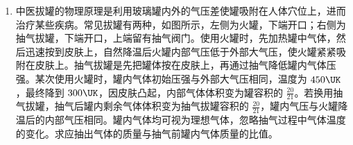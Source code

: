 \documentclass[\gkver]{gaokaozhenti}
\begin{document}
\begin{enumerate}
{

②由 $U-I$ 图像知，干电池的电动势为 $E=1.55\UV$，电压表示数为 0 时，电路中的电流为 $0.6\UA$，由闭合电路欧姆定律得 $r+R=\frac{E}{I}=\frac{1.55\UV}{0.6\UA}\approx2.58\UO$，电源内阻小于 $1\UO$，故所选的定值电阻为 $R_{1}$。

③实物图连接如图所示。

}

\item
中医拔罐的物理原理是利用玻璃罐内外的气压差使罐吸附在人体穴位上，进而治疗某些疾病。常见拔罐有两种，如图所示，左侧为火罐，下端开口；右侧为抽气拔罐，下端开口，上端留有抽气阀门。使用火罐时，先加热罐中气体，然后迅速按到皮肤上，自然降温后火罐内部气压低于外部大气压，使火罐紧紧吸附在皮肤上。抽气拔罐是先把罐体按在皮肤上，再通过抽气降低罐内气体压强。某次使用火罐时，罐内气体初始压强与外部大气压相同，温度为 $450\UK$，最终降到 $300\UK$，因皮肤凸起，内部气体体积变为罐容积的 $\frac{20}{21}$。若换用抽气拔罐，抽气后罐内剩余气体体积变为抽气拔罐容积的 $\frac{20}{21}$，罐内气压与火罐降温后的内部气压相同。罐内气体均可视为理想气体，忽略抽气过程中气体温度的变化。求应抽出气体的质量与抽气前罐内气体质量的比值。




\end{enumerate}
\end{document}
